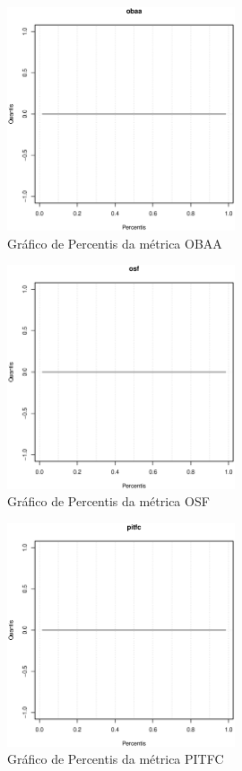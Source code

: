 \begin{anexosenv}
\newpage

\begin{figure}[h]
  \centering
  \includegraphics[width=0.6\textwidth]
      {dados/linux/obaa.eps}
  \caption{Gráfico de Percentis da métrica OBAA}
\end{figure}

\begin{figure}[h]
  \centering
  \includegraphics[width=0.6\textwidth]
      {dados/linux/osf.eps}
  \caption{Gráfico de Percentis da métrica OSF}
\end{figure}

\newpage

\begin{figure}[h]
  \centering
  \includegraphics[width=0.6\textwidth]
      {dados/linux/pitfc.eps}
  \caption{Gráfico de Percentis da métrica PITFC}
\end{figure}


\end{anexosenv}
